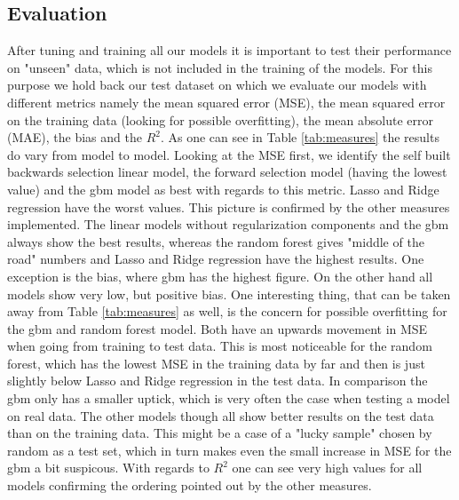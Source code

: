 \subsection{Evaluation}
After tuning and training all our models it is important to test their performance on "unseen" data, which is not included in the training of the models. For this purpose we hold back our test dataset on which we evaluate our models with different metrics namely the mean squared error (MSE), the mean squared error on the training data (looking for possible overfitting), the mean absolute error (MAE), the bias and the $R^2$. As one can see in Table \ref{tab:measures} the results do vary from model to model. Looking at the MSE first, we identify the self built backwards selection linear model, the forward selection model (having the lowest value) and the gbm model as best with regards to this metric. Lasso and Ridge regression have the worst values. This picture is confirmed by the other measures implemented. The linear models without regularization components and the gbm always show the best results, whereas the random forest gives "middle of the road" numbers and Lasso and Ridge regression have the highest results. One exception is the bias, where gbm has the highest figure. On the other hand all models show very low, but positive bias. One interesting thing, that can be taken away from Table \ref{tab:measures} as well, is the concern for possible overfitting for the gbm and random forest model.
Both have an upwards movement in MSE when going from training to test data. This is most noticeable for the random forest, which has the lowest MSE in the training data by far and then is just slightly below Lasso and Ridge regression in the test data. In comparison the gbm only has a smaller uptick, which is very often the case when testing a model on real data. The other models though all show better results on the test data than on the training data. This might be a case of a "lucky sample" chosen by random as a test set, which in turn makes even the small increase in MSE for the gbm a bit suspicous. With regards to $R^2$ one can see very high values for all models confirming the ordering pointed out by the other measures. 



